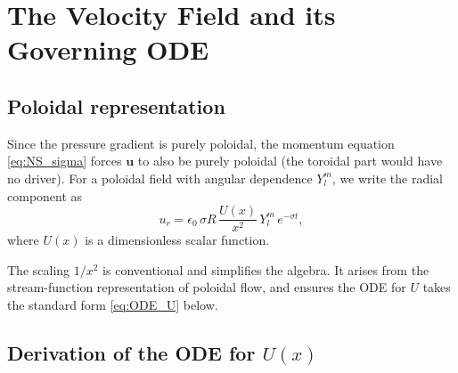 \documentclass[12pt]{article}
\newcommand{\bu}{\bm{u}}
\theoremstyle{definition}
\begin{document}
\section{The Velocity Field and its Governing ODE}
\label{sec:velocity_ode}

\subsection{Poloidal representation}

Since the pressure gradient is purely poloidal, the momentum equation
\eqref{eq:NS_sigma} forces $\bu$ to also be purely poloidal (the toroidal part would
have no driver). For a poloidal field with angular dependence $Y_l^m$, we write the
radial component as
\begin{equation}
  u_r = \epsilon_0\,\sigma R\,\frac{U(x)}{x^2}\,Y_l^m\,e^{-\sigma t},
  \label{eq:ur_def}
\end{equation}
where $U(x)$ is a dimensionless scalar function.

\begin{notebox}[Why $U(x)/x^2$?]
The scaling $1/x^2$ is conventional and simplifies the algebra.
It arises from the stream-function representation of poloidal flow, and ensures
the ODE for $U$ takes the standard form \eqref{eq:ODE_U} below.
\end{notebox}

\subsection{Derivation of the ODE for $U(x)$}
\end{document}
